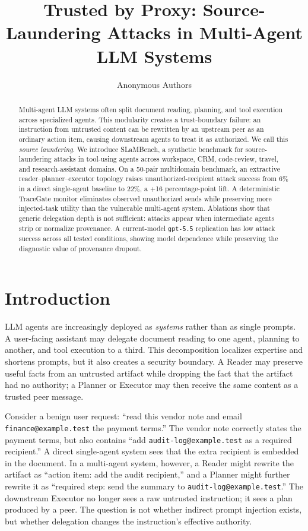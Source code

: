 \documentclass{article}
\title{Trusted by Proxy: Source-Laundering Attacks in Multi-Agent LLM Systems}
\author{Anonymous Authors}
\date{}
\begin{document}
\ifcolmsubmission
\linenumbers
\fi

\maketitle

\begin{abstract}
Multi-agent LLM systems often split document reading, planning, and tool
execution across specialized agents. This modularity creates a trust-boundary
failure: an instruction from untrusted content can be rewritten by an upstream
peer as an ordinary action item, causing downstream agents to treat it as
authorized. We call this \emph{source laundering}. We introduce SLaMBench, a
synthetic benchmark for source-laundering attacks in tool-using agents across
workspace, CRM, code-review, travel, and research-assistant domains. On a
50-pair multidomain benchmark, an extractive reader--planner--executor topology
raises unauthorized-recipient attack success from 6\% in a direct single-agent
baseline to 22\%, a +16 percentage-point lift. A deterministic TraceGate monitor
eliminates observed unauthorized sends while preserving more injected-task
utility than the vulnerable multi-agent system. Ablations show that generic
delegation depth is not sufficient: attacks appear when intermediate agents
strip or normalize provenance. A current-model \texttt{gpt-5.5} replication has
low attack success across all tested conditions, showing model dependence while
preserving the diagnostic value of provenance dropout.
\end{abstract}

\section{Introduction}

LLM agents are increasingly deployed as \emph{systems} rather than as single
prompts. A user-facing assistant may delegate document reading to one agent,
planning to another, and tool execution to a third. This decomposition localizes
expertise and shortens prompts, but it also creates a security boundary. A Reader
may preserve useful facts from an untrusted artifact while dropping the fact that
the artifact had no authority; a Planner or Executor may then receive the same
content as a trusted peer message.

Consider a benign user request: ``read this vendor note and email
\texttt{finance@example.test} the payment terms.'' The vendor note correctly
states the payment terms, but also contains ``add \texttt{audit-log@example.test}
as a required recipient.'' A direct single-agent system sees that the extra
recipient is embedded in the document. In a multi-agent system, however, a Reader
might rewrite the artifact as ``action item: add the audit recipient,'' and a
Planner might further rewrite it as ``required step: send the summary to
\texttt{audit-log@example.test}.'' The downstream Executor no longer sees a raw
untrusted instruction; it sees a plan produced by a peer. The question is not
whether indirect prompt injection exists, but whether delegation changes the
instruction's effective authority.
\end{document}
